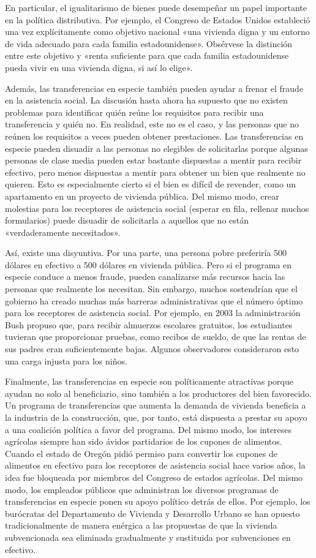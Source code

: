 \documentclass[10pt,a4paper]{article}
\begin{document}
En particular, el igualitarismo de bienes puede desempeñar un papel importante en la política distributiva. Por ejemplo, el Congreso de Estados Unidos estableció una vez explícitamente como objetivo nacional «una vivienda digna y un entorno de vida adecuado para cada familia estadounidense». Obsérvese la distinción entre este objetivo y «renta suficiente para que cada familia estadounidense pueda vivir en una vivienda digna, si así lo elige».

Además, las transferencias en especie también pueden ayudar a frenar el fraude en la asistencia social. La discusión hasta ahora ha supuesto que no existen problemas para identificar quién reúne los requisitos para recibir una transferencia y quién no. En realidad, este no es el caso, y las personas que no reúnen los requisitos a veces pueden obtener prestaciones. Las transferencias en especie pueden disuadir a las personas no elegibles de solicitarlas porque algunas personas de clase media pueden estar bastante dispuestas a mentir para recibir efectivo, pero menos dispuestas a mentir para obtener un bien que realmente no quieren. Esto es especialmente cierto si el bien es difícil de revender, como un apartamento en un proyecto de vivienda pública. Del mismo modo, crear molestias para los receptores de asistencia social (esperar en fila, rellenar muchos formularios) puede disuadir de solicitarla a aquellos que no están «verdaderamente necesitados».

Así, existe una disyuntiva. Por una parte, una persona pobre preferiría 500 dólares en efectivo a 500 dólares en vivienda pública. Pero si el programa en especie conduce a menos fraude, pueden canalizarse más recursos hacia las personas que realmente los necesitan. Sin embargo, muchos sostendrían que el gobierno ha creado muchas más barreras administrativas que el número óptimo para los receptores de asistencia social. Por ejemplo, en 2003 la administración Bush propuso que, para recibir almuerzos escolares gratuitos, los estudiantes tuvieran que proporcionar pruebas, como recibos de sueldo, de que las rentas de sus padres eran suficientemente bajas. Algunos observadores consideraron esto una carga injusta para los niños.

Finalmente, las transferencias en especie son políticamente atractivas porque ayudan no solo al beneficiario, sino también a los productores del bien favorecido. Un programa de transferencias que aumenta la demanda de vivienda beneficia a la industria de la construcción, que, por tanto, está dispuesta a prestar su apoyo a una coalición política a favor del programa. Del mismo modo, los intereses agrícolas siempre han sido ávidos partidarios de los cupones de alimentos. Cuando el estado de Oregón pidió permiso para convertir los cupones de alimentos en efectivo para los receptores de asistencia social hace varios años, la idea fue bloqueada por miembros del Congreso de estados agrícolas. Del mismo modo, los empleados públicos que administran los diversos programas de transferencias en especie ponen su apoyo político detrás de ellos. Por ejemplo, los burócratas del Departamento de Vivienda y Desarrollo Urbano se han opuesto tradicionalmente de manera enérgica a las propuestas de que la vivienda subvencionada sea eliminada gradualmente y sustituida por subvenciones en efectivo.
\end{document}
